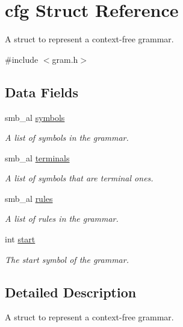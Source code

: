 \hypertarget{structcfg}{\section{cfg \-Struct \-Reference}
\label{structcfg}
}


\-A struct to represent a context-\/free grammar.  




{\ttfamily \#include $<$gram.\-h$>$}

\subsection*{\-Data \-Fields}
\begin{DoxyCompactItemize}
\item 
smb\-\_\-al \hyperlink{structcfg_af90e802d07cdf4a88bde8043b57ec666}{symbols}
\begin{DoxyCompactList}\small\item\em \-A list of symbols in the grammar. \end{DoxyCompactList}\item 
smb\-\_\-al \hyperlink{structcfg_ae85a135e82c4af0e75739a21b3ec03b4}{terminals}
\begin{DoxyCompactList}\small\item\em \-A list of symbols that are terminal ones. \end{DoxyCompactList}\item 
\hypertarget{structcfg_a85034aa36a9d4ff1044b8a4fb14cccb9}{smb\-\_\-al \hyperlink{structcfg_a85034aa36a9d4ff1044b8a4fb14cccb9}{rules}}\label{structcfg_a85034aa36a9d4ff1044b8a4fb14cccb9}

\begin{DoxyCompactList}\small\item\em \-A list of rules in the grammar. \end{DoxyCompactList}\item 
\hypertarget{structcfg_a37722a150250e2a5a98e5e0d11e53449}{int \hyperlink{structcfg_a37722a150250e2a5a98e5e0d11e53449}{start}}\label{structcfg_a37722a150250e2a5a98e5e0d11e53449}

\begin{DoxyCompactList}\small\item\em \-The start symbol of the grammar. \end{DoxyCompactList}\end{DoxyCompactItemize}


\subsection{\-Detailed \-Description}
\-A struct to represent a context-\/free grammar. 

